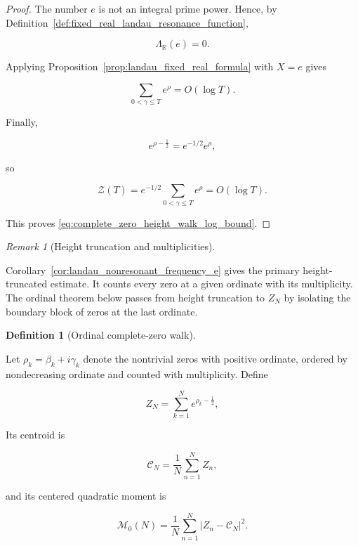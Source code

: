 \documentclass[11pt]{amsart}
\numberwithin{equation}{section}
\theoremstyle{plain}
\theoremstyle{definition}
\newtheorem{definition}[theorem]{Definition}
\theoremstyle{remark}
\newtheorem{remark}[theorem]{Remark}
\begin{document}
\begin{proof}
The number \(e\) is not an integral prime power. Hence, by
Definition~\ref{def:fixed_real_landau_resonance_function},

\begin{equation}
\Lambda_{\mathbb R}(e)=0.
\end{equation}

Applying Proposition~\ref{prop:landau_fixed_real_formula} with \(X=e\)
gives

\begin{equation}
\sum_{0<\gamma\le T}e^{\rho}
=
O(\log T).
\end{equation}

Finally,

\begin{equation}
e^{\rho-\frac12}
=
e^{-1/2}e^{\rho},
\end{equation}

so

\begin{equation}
\mathcal Z(T)
=
e^{-1/2}
\sum_{0<\gamma\le T}e^{\rho}
=
O(\log T).
\end{equation}

This proves \eqref{eq:complete_zero_height_walk_log_bound}.
\end{proof}

\begin{remark}[Height truncation and multiplicities]
\label{rem:height_truncation_multiplicity_safe}

Corollary~\ref{cor:landau_nonresonant_frequency_e} gives the primary
height-truncated estimate. It counts every zero at a given ordinate with
its multiplicity. The ordinal theorem below passes from height
truncation to \(Z_N\) by isolating the boundary block of zeros at the
last ordinate.

\end{remark}

\begin{definition}[Ordinal complete-zero walk]
\label{def:ordinal_complete_zero_walk}

Let \(\rho_k=\beta_k+i\gamma_k\) denote the nontrivial zeros with
positive ordinate, ordered by nondecreasing ordinate and counted with
multiplicity. Define

\begin{equation}
Z_N
=
\sum_{k=1}^{N}e^{\rho_k-\frac12},
\label{eq:ZN_definition}
\end{equation}

Its centroid is

\begin{equation}
\mathcal C_N
=
\frac1N
\sum_{n=1}^{N}Z_n,
\label{eq:calC_definition}
\end{equation}

and its centered quadratic moment is

\begin{equation}
\mathcal M_0(N)
=
\frac1N
\sum_{n=1}^{N}
\left|Z_n-\mathcal C_N\right|^2.
\label{eq:calM0_definition}
\end{equation}

\end{definition}
\end{document}
